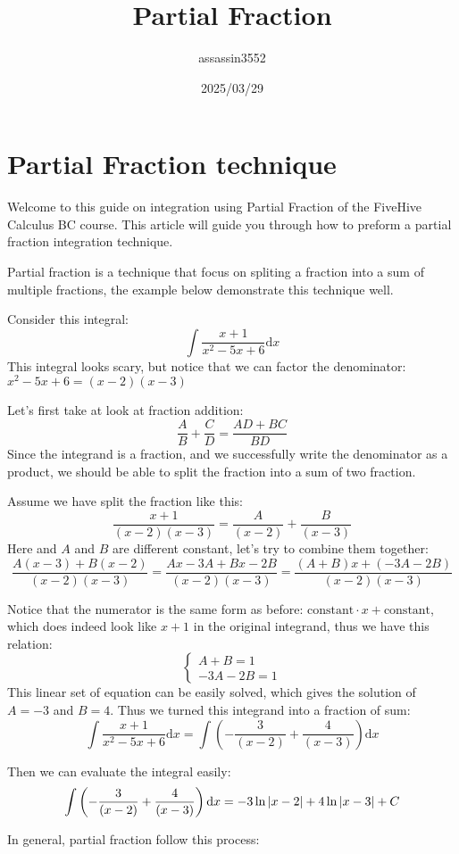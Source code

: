 \documentclass{article}
\title{Partial Fraction}
\author{assassin3552}
\date{2025/03/29}
\numberwithin{equation}{section}
\begin{document}
\maketitle
\section{Partial Fraction technique}
Welcome to this guide on integration using Partial Fraction of the FiveHive Calculus BC course. This article will guide you through how to preform a partial fraction integration technique.

Partial fraction is a technique that focus on spliting a fraction into a sum of multiple fractions, the example below demonstrate this technique well.

Consider this integral:
\[
\int \frac{x + 1}{x^2 -5x + 6} \mathrm{d}x
\]
This integral looks scary, but notice that we can factor the denominator:
$x^2 - 5x + 6 = (x-2)(x-3)$

Let's first take at look at fraction addition:
\[
\frac{A}{B} + \frac{C}{D} = \frac{AD + BC}{BD}
\]
Since the integrand is a fraction, and we successfully write the denominator as a product,
we should be able to split the fraction into a sum of two fraction.

Assume we have split the fraction like this:
\[
\frac{x + 1}{(x - 2)(x - 3)} = \frac{A}{(x - 2)} + \frac{B}{(x - 3)}
\]
Here and $A$ and $B$ are different constant, let's try to combine them together:
\[
\frac{A(x - 3) +B(x - 2)}{(x - 2)(x - 3)} = \frac{Ax - 3A + Bx - 2B}{(x-2)(x-3)} = \frac{(A+B)x + (-3A-2B)}{(x-2)(x-3)}
\]

Notice that the numerator is the same form as before: $\text{constant} \cdot x + \text{constant}$, which does indeed look like $x+1$ in the original integrand,
thus we have this relation:
\[
\begin{cases}
    A+B = 1\\
    -3A - 2B = 1
\end{cases}
\]
This linear set of equation can be easily solved, which gives the solution of $A = -3$ and $B = 4$. Thus we turned this integrand into a fraction of sum:
\[
\int \frac{x + 1}{x^2 - 5x + 6} \mathrm{d}x= \int \left(-\frac{3}{(x - 2)} + \frac{4}{(x - 3)} \right) \mathrm{d}x
\]

Then we can evaluate the integral easily:
\[
\int \left(-\frac{3}{(x - 2)} + \frac{4}{(x - 3)} \right) \mathrm{d}x = -3\ln\abs{x-2} + 4\ln\abs{x-3} + C
\]

\newpage
In general, partial fraction follow this process:
\end{document}

